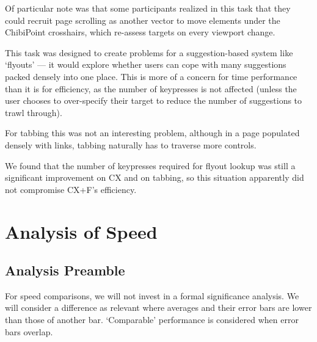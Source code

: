\documentclass[11pt,openright,a4paper]{report}
\begin{document}
Of particular note was that some participants realized in this task that they could recruit page scrolling as another vector to move elements under the ChibiPoint crosshairs, which re-assess targets on every viewport change.

This task was designed to create problems for a suggestion-based system like `flyouts' --- it would explore whether users can cope with many suggestions packed densely into one place. This is more of a concern for time performance than it is for efficiency, as the number of keypresses is not affected (unless the user chooses to over-specify their target to reduce the number of suggestions to trawl through).

For tabbing this was not an interesting problem, although in a page populated densely with links, tabbing naturally has to traverse more controls.

We found that the number of keypresses required for flyout lookup was still a significant improvement on CX and on tabbing, so this situation apparently did not compromise CX+F's efficiency.

\clearpage
\section{Analysis of Speed}
\subsection{Analysis Preamble}
For speed comparisons, we will not invest in a formal significance analysis. We will consider a difference as relevant where averages and their error bars are lower than those of another bar. `Comparable' performance is considered when error bars overlap.
\end{document}
